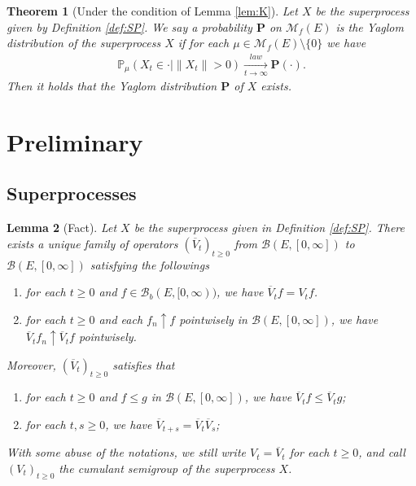 \documentclass[12pt,a4paper]{amsart}
\numberwithin{equation}{section}
\theoremstyle{plain}
\newtheorem{thm}{Theorem}[section]
\newtheorem{lem}[thm]{Lemma}
\theoremstyle{definition}
\begin{document}
\begin{thm}[Under the condition of Lemma \ref{lem:K}]
  \label{thm:Y}
	Let $X$ be the superprocess given by Definition \ref{def:SP}. 
  We say a probability ${\mathbf P}$ on $\mathcal M_f(E)$ is the \emph{Yaglom distribution} of the superprocess $X$ if for each $\mu\in \mathcal M_f(E)\setminus\{0\}$ we have
  \begin{align}
    \mathbb P_\mu(X_t \in \cdot | \|X_t\|>0) 
    \xrightarrow[t\to \infty]{law} {\mathbf P}(\cdot).
  \end{align}
  Then it holds that the Yaglom distribution $\mathbf P$ of $X$ exists.
\end{thm}
\section{Preliminary}
\subsection{Superprocesses}
  \begin{lem}[Fact]
    \label{lem:C}
    Let $X$ be the superprocess given in Definition \ref{def:SP}.
    There exists a unique family of operators $(\overline V_t)_{t \geq 0}$ from $\mathcal B(E, [0,\infty])$ to $\mathcal B(E, [0,\infty])$ satisfying the followings
    \begin{enumerate}[label=(\alph*)]
    \item
      for each $t\geq 0$ and $f \in \mathcal B_b(E, [0,\infty))$, we have $\overline V_tf = V_tf$.
    \item
      for each $t\geq 0$ and each $f_n \uparrow f$ pointwisely in $\mathcal B(E, [0,\infty])$, we have $\overline V_tf_n \uparrow \overline V_tf$ pointwisely.
    \end{enumerate}
    Moreover, $(\overline V_t)_{t\geq 0}$ satisfies that
    \begin{enumerate}
    \item
      for each $t\geq 0$ and $f\leq g$ in $\mathcal B(E,[0,\infty])$, we have $\overline V_tf \leq \overline V_tg$;
    \item
      for each $t, s\geq 0$, we have $\overline V_{t+s} = \overline V_t \overline V_s$;
    \end{enumerate}
    With some abuse of the notations, we still write $V_t = \overline V_t$ for each $t\geq 0$, and call $(V_t)_{t\geq 0}$ the \emph{cumulant semigroup} of the superprocess $X$.
  \end{lem}
\end{document}
